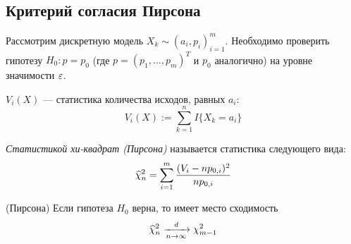 \subsection{Критерий согласия Пирсона}

\begin{problem}
	Рассмотрим дискретную модель $X_k \sim (a_i, p_i)_{i = 1}^m$. Необходимо проверить гипотезу $H_0 \colon p = p_0$ (где $p = (p_1, \ldots, p_m)^T$ и $p_0$ аналогично) на уровне значимости $\varepsilon$.
\end{problem}

\begin{definition}
	$V_i(X)$ --- статистика количества исходов, равных $a_i$:
	\[
		V_i(X) := \sum_{k = 1}^n I\{X_k = a_i\}
	\]
\end{definition}

\begin{definition}
	\textit{Статистикой хи-квадрат (Пирсона)} называется статистика следующего вида:
	\[
		\widehat{\chi}_n^2 = \sum_{i = 1}^m \frac{(V_i - np_{0, i})^2}{np_{0, i}}
	\]
\end{definition}

\begin{theorem} (Пирсона)
	Если гипотеза $H_0$ верна, то имеет место сходимость
	\[
		\widehat{\chi}_n^2 \xrightarrow[n \to \infty]{d} \chi_{m - 1}^2
	\]
\end{theorem}

